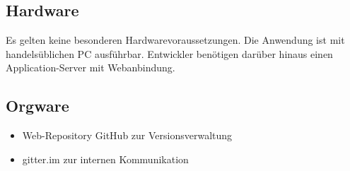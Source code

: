 \subsection{Hardware}

Es gelten keine besonderen Hardwarevoraussetzungen. Die Anwendung ist mit handelsüblichen PC ausführbar. Entwickler benötigen darüber hinaus einen Application-Server mit Webanbindung.

\subsection{Orgware}

\begin{itemize}
\item Web-Repository GitHub zur Versionsverwaltung
\item gitter.im zur internen Kommunikation 
\end{itemize}
